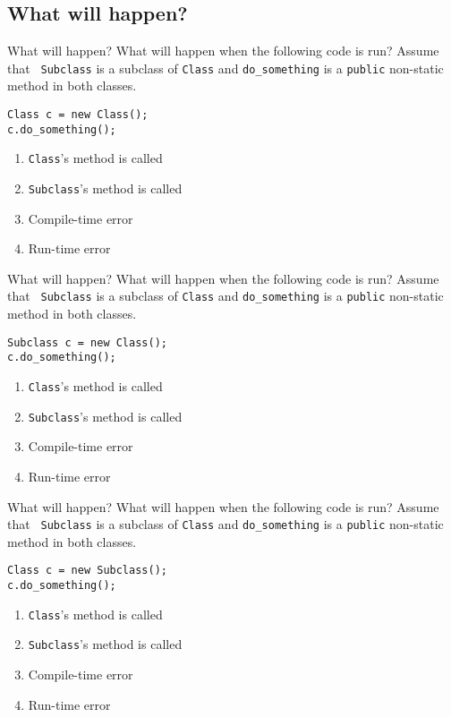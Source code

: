 \documentclass[9pt]{beamer}
\begin{document}
\subsection{What will happen?}
\begin{frame}[fragile]{What will happen?}
  What will happen when the following code is run? Assume that {\tt
  Subclass} is a subclass of {\tt Class} and {\tt do\_something} is a
  {\tt public} non-static method in both classes.
  \begin{lstlisting}
Class c = new Class();
c.do_something();
  \end{lstlisting}
  \begin{enumerate}
    \item
      \alert<2>{{\tt Class}'s method is called}
    \item
      {\tt Subclass}'s method is called
    \item
      Compile-time error
    \item
      Run-time error
  \end{enumerate}
\end{frame}

\begin{frame}[fragile]{What will happen?}
  What will happen when the following code is run? Assume that {\tt
  Subclass} is a subclass of {\tt Class} and {\tt do\_something} is a
  {\tt public} non-static method in both classes.
  \begin{lstlisting}
Subclass c = new Class();
c.do_something();
  \end{lstlisting}
  \begin{enumerate}
    \item
      {\tt Class}'s method is called
    \item
      {\tt Subclass}'s method is called
    \item
      \alert<2>{Compile-time error}
    \item
      Run-time error
  \end{enumerate}
\end{frame}

\begin{frame}[fragile]{What will happen?}
  What will happen when the following code is run? Assume that {\tt
  Subclass} is a subclass of {\tt Class} and {\tt do\_something} is a
  {\tt public} non-static method in both classes.
  \begin{lstlisting}
Class c = new Subclass();
c.do_something();
  \end{lstlisting}
  \begin{enumerate}
    \item
      {\tt Class}'s method is called
    \item
      \alert<2>{{\tt Subclass}'s method is called}
    \item
      Compile-time error
    \item
      Run-time error
  \end{enumerate}
\end{frame}
\end{document}
